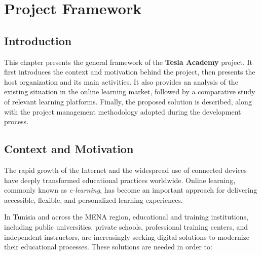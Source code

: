 \begingroup
\renewcommand{\baselinestretch}{0.85}
\chapter{Project Framework}
\minitoc
\endgroup
\newpage

\section*{Introduction}

This chapter presents the general framework of the \textbf{Tesla Academy} project.
It first introduces the context and motivation behind the project, then presents the host
organization and its main activities. It also provides an analysis of the existing situation
in the online learning market, followed by a comparative study of relevant learning
platforms. Finally, the proposed solution is described, along with the project management
methodology adopted during the development process.

\section{Context and Motivation}

The rapid growth of the Internet and the widespread use of connected devices have deeply
transformed educational practices worldwide. Online learning, commonly known as
\textit{e-learning}, has become an important approach for delivering accessible, flexible,
and personalized learning experiences.

In Tunisia and across the MENA region, educational and training institutions, including
public universities, private schools, professional training centers, and independent
instructors, are increasingly seeking digital solutions to modernize their educational
processes. These solutions are needed in order to:

